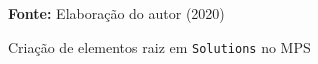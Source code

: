 \begin{figure}[ht!]
\centering

\caption{\textmd{Criação de elementos raiz em  \texttt{Solutions} no \gls{MPS}}}
\label{fig:solutions}

\par\medskip\textbf{Fonte:} Elaboração do autor (2020) \par\medskip

\end{figure}

